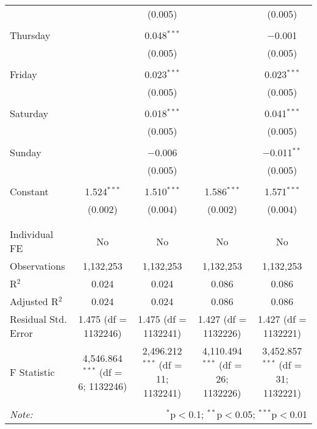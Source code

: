 \documentclass[
]{article}
\begin{document}
\begin{table}[!htbp]
{\begin{tabular}{@{\extracolsep{5pt}}lcccc}
  &  & (0.005) &  & (0.005) \\ 
  & & & & \\ 
 Thursday &  & 0.048$^{***}$ &  & $-$0.001 \\ 
  &  & (0.005) &  & (0.005) \\ 
  & & & & \\ 
 Friday &  & 0.023$^{***}$ &  & 0.023$^{***}$ \\ 
  &  & (0.005) &  & (0.005) \\ 
  & & & & \\ 
 Saturday &  & 0.018$^{***}$ &  & 0.041$^{***}$ \\ 
  &  & (0.005) &  & (0.005) \\ 
  & & & & \\ 
 Sunday &  & $-$0.006 &  & $-$0.011$^{**}$ \\ 
  &  & (0.005) &  & (0.005) \\ 
  & & & & \\ 
 Constant & 1.524$^{***}$ & 1.510$^{***}$ & 1.586$^{***}$ & 1.571$^{***}$ \\ 
  & (0.002) & (0.004) & (0.002) & (0.004) \\ 
  & & & & \\ 
\hline \\[-1.8ex] 
Individual FE & No & No & No & No \\ 
Observations & 1,132,253 & 1,132,253 & 1,132,253 & 1,132,253 \\ 
R$^{2}$ & 0.024 & 0.024 & 0.086 & 0.086 \\ 
Adjusted R$^{2}$ & 0.024 & 0.024 & 0.086 & 0.086 \\ 
Residual Std. Error & 1.475 (df = 1132246) & 1.475 (df = 1132241) & 1.427 (df = 1132226) & 1.427 (df = 1132221) \\ 
F Statistic & 4,546.864$^{***}$ (df = 6; 1132246) & 2,496.212$^{***}$ (df = 11; 1132241) & 4,110.494$^{***}$ (df = 26; 1132226) & 3,452.857$^{***}$ (df = 31; 1132221) \\ 
\hline 
\hline \\[-1.8ex] 
\textit{Note:}  & \multicolumn{4}{r}{$^{*}$p$<$0.1; $^{**}$p$<$0.05; $^{***}$p$<$0.01} \\ 
\end{tabular}
} 
\end{table} 
\newpage
\end{document}
